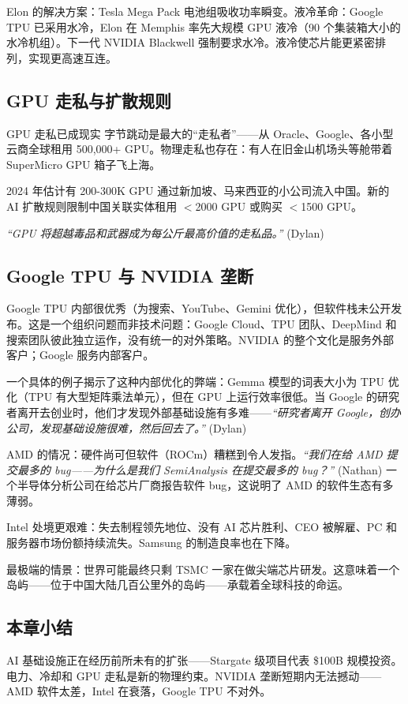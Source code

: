 Elon 的解决方案：Tesla Mega Pack 电池组吸收功率瞬变。液冷革命：Google TPU 已采用水冷，Elon 在 Memphis 率先大规模 GPU 液冷（90 个集装箱大小的水冷机组）。下一代 NVIDIA Blackwell 强制要求水冷。液冷使芯片能更紧密排列，实现更高速互连。

\subsection{GPU 走私与扩散规则}

\begin{warningbox}{GPU 走私已成现实}
字节跳动是最大的``走私者''——从 Oracle、Google、各小型云商全球租用 500,000+ GPU。物理走私也存在：有人在旧金山机场头等舱带着 SuperMicro GPU 箱子飞上海。

2024 年估计有 200-300K GPU 通过新加坡、马来西亚的小公司流入中国。新的 AI 扩散规则限制中国关联实体租用 $<$2000 GPU 或购买 $<$1500 GPU。

\textit{``GPU 将超越毒品和武器成为每公斤最高价值的走私品。''} (Dylan)
\end{warningbox}

\subsection{Google TPU 与 NVIDIA 垄断}

Google TPU 内部很优秀（为搜索、YouTube、Gemini 优化），但软件栈未公开发布。这是一个组织问题而非技术问题：Google Cloud、TPU 团队、DeepMind 和搜索团队彼此独立运作，没有统一的对外策略。NVIDIA 的整个文化是服务外部客户；Google 服务内部客户。

一个具体的例子揭示了这种内部优化的弊端：Gemma 模型的词表大小为 TPU 优化（TPU 有大型矩阵乘法单元），但在 GPU 上运行效率很低。当 Google 的研究者离开去创业时，他们才发现外部基础设施有多难——\textit{``研究者离开 Google，创办公司，发现基础设施很难，然后回去了。''} (Dylan)

AMD 的情况：硬件尚可但软件（ROCm）糟糕到令人发指。\textit{``我们在给 AMD 提交最多的 bug——为什么是我们 SemiAnalysis 在提交最多的 bug？''} (Nathan) 一个半导体分析公司在给芯片厂商报告软件 bug，这说明了 AMD 的软件生态有多薄弱。

Intel 处境更艰难：失去制程领先地位、没有 AI 芯片胜利、CEO 被解雇、PC 和服务器市场份额持续流失。Samsung 的制造良率也在下降。

最极端的情景：世界可能最终只剩 TSMC 一家在做尖端芯片研发。这意味着一个岛屿——位于中国大陆几百公里外的岛屿——承载着全球科技的命运。

\subsection{本章小结}

AI 基础设施正在经历前所未有的扩张——Stargate 级项目代表 \$100B 规模投资。电力、冷却和 GPU 走私是新的物理约束。NVIDIA 垄断短期内无法撼动——AMD 软件太差，Intel 在衰落，Google TPU 不对外。

